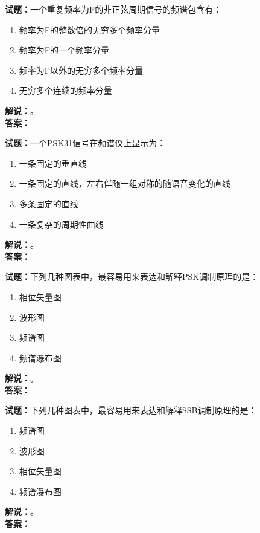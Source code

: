 \documentclass{ctexbook}
\begin{document}
\bigskip

\noindent\textbf{试题：}一个重复频率为F的非正弦周期信号的频谱包含有：
\begin{enumerate}[leftmargin=3em]
  \item 频率为F的整数倍的无穷多个频率分量
  \item 频率为F的一个频率分量
  \item 频率为F以外的无穷多个频率分量
  \item 无穷多个连续的频率分量
\end{enumerate}
\noindent\textbf{解说：}\textbf{}。\\\noindent\textbf{答案：}

\bigskip

\noindent\textbf{试题：}一个PSK31信号在频谱仪上显示为：
\begin{enumerate}[leftmargin=3em]
  \item 一条固定的垂直线
  \item 一条固定的直线，左右伴随一组对称的随语音变化的直线
  \item 多条固定的直线
  \item 一条复杂的周期性曲线
\end{enumerate}
\noindent\textbf{解说：}\textbf{}。\\\noindent\textbf{答案：}

\bigskip

\noindent\textbf{试题：}下列几种图表中，最容易用来表达和解释PSK调制原理的是：
\begin{enumerate}[leftmargin=3em]
  \item 相位矢量图
  \item 波形图
  \item 频谱图
  \item 频谱瀑布图
\end{enumerate}
\noindent\textbf{解说：}\textbf{}。\\\noindent\textbf{答案：}

\bigskip

\noindent\textbf{试题：}下列几种图表中，最容易用来表达和解释SSB调制原理的是：
\begin{enumerate}[leftmargin=3em]
  \item 频谱图
  \item 波形图
  \item 相位矢量图
  \item 频谱瀑布图
\end{enumerate}
\noindent\textbf{解说：}\textbf{}。\\\noindent\textbf{答案：}
\end{document}
